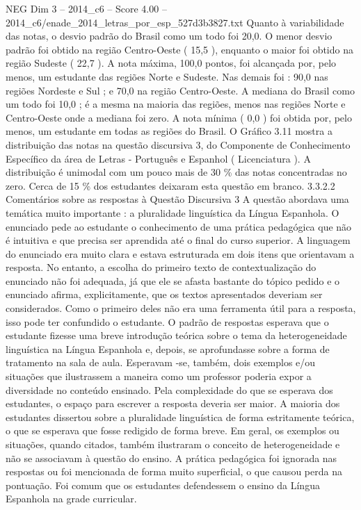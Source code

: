 \begin{textsample}{NEG Dim 3 – 2014\_c6 – Score 4.00 – 2014\_c6/enade\_2014\_letras\_por\_esp\_527d3b3827.txt}
Quanto à variabilidade das notas, o desvio padrão do Brasil como um todo foi 20,0.
O menor desvio padrão foi obtido na região Centro-Oeste ( 15,5 ), enquanto o maior foi obtido na região Sudeste ( 22,7 ).
A nota máxima, 100,0 pontos, foi alcançada por, pelo menos, um estudante das regiões Norte e Sudeste.
Nas demais foi : 90,0 nas regiões Nordeste e Sul ; e 70,0 na região Centro-Oeste.
A mediana do Brasil como um todo foi 10,0 ; é a mesma na maioria das regiões, menos nas regiões Norte e Centro-Oeste onde a mediana foi zero.
A nota mínima ( 0,0 ) foi obtida por, pelo menos, um estudante em todas as regiões do Brasil.
O Gráfico 3.11 mostra a distribuição das notas na questão discursiva 3, do Componente de Conhecimento Específico da área de Letras - Português e Espanhol ( Licenciatura ).
A distribuição é unimodal com um pouco mais de 30 \% das notas concentradas no zero.
Cerca de 15 \% dos estudantes deixaram esta questão em branco. 3.3.2.2 Comentários sobre as respostas à Questão Discursiva 3 A questão abordava uma temática muito importante : a pluralidade linguística da Língua Espanhola.
O enunciado pede ao estudante o conhecimento de uma prática pedagógica que não é intuitiva e que precisa ser aprendida até o final do curso superior.
A linguagem do enunciado era muito clara e estava estruturada em dois itens que orientavam a resposta.
No entanto, a escolha do primeiro texto de contextualização do enunciado não foi adequada, já que ele se afasta bastante do tópico pedido e o enunciado afirma, explicitamente, que os textos apresentados deveriam ser considerados.
Como o primeiro deles não era uma ferramenta útil para a resposta, isso pode ter confundido o estudante.
O padrão de respostas esperava que o estudante fizesse uma breve introdução teórica sobre o tema da heterogeneidade linguística na Língua Espanhola e, depois, se aprofundasse sobre a forma de tratamento na sala de aula.
Esperavam -se, também, dois exemplos e/ou situações que ilustrassem a maneira como um professor poderia expor a diversidade no conteúdo ensinado.
Pela complexidade do que se esperava dos estudantes, o espaço para escrever a resposta deveria ser maior.
A maioria dos estudantes dissertou sobre a pluralidade linguística de forma estritamente teórica, o que se esperava que fosse redigido de forma breve.
Em geral, os exemplos ou situações, quando citados, também ilustraram o conceito de heterogeneidade e não se associavam à questão do ensino.
A prática pedagógica foi ignorada nas respostas ou foi mencionada de forma muito superficial, o que causou perda na pontuação.
Foi comum que os estudantes defendessem o ensino da Língua Espanhola na grade curricular.

\end{textsample}
